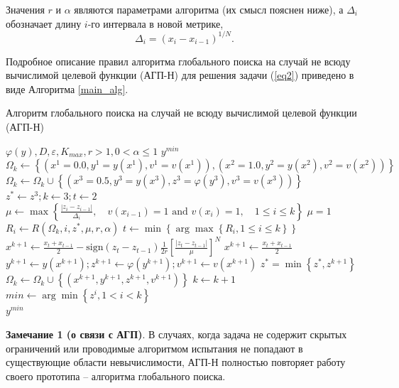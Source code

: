 \documentclass[a4paper,12pt,russian]{article}
\begin{document}
Значения $r$ и $\alpha$ являются параметрами алгоритма (их смысл пояснен ниже), а $\Delta_i$ обозначает длину $i$-го интервала в новой метрике,
\[
\Delta _i= (x_i-x_{i-1})^{1/N}.
\]

Подробное описание правил алгоритма глобального поиска на случай не всюду вычислимой целевой функции (АГП-Н)  для решения задачи (\ref{eq2}) приведено в виде Алгоритма \ref{main_alg}.

\begin{algorithm}
\caption{Алгоритм глобального поиска на случай не всюду вычислимой целевой функции (АГП-Н)}\label{main_alg}
\begin{algorithmic}[1]
\Require $\varphi(y), D, \varepsilon, K_{max}, r >1, 0 < \alpha \leq 1$
\Ensure $y^{min}$
\State $\Omega_k \gets \left\{(x^1 = 0.0, y^1 = y(x^1), v^1=v(x^1)), (x^2 = 1.0, y^2 = y(x^2), v^2 = v(x^2))\right\}$
\State $\Omega_k \gets \Omega_k \cup \left\{(x^3 = 0.5, y^3 = y(x^3), z^3 = \varphi(y^3), v^3 = v(x^3))\right\}$
\State $z^* \gets z^3; k \gets 3; t \gets 2$
    \State $\mu \gets \max\left\{ \frac{|z_i-z_{i-1}|}{\Delta _i},\quad v(x_{i-1}) = 1 \text{ and } v(x_i) = 1, \quad 1 \leq i \leq k  \right\}$
       \State $\mu = 1$
   \EndIf
        \State $R_i \gets R(\Omega_k, i, z^*, \mu, r, \alpha)$
    \EndFor
    \State $t \gets \min \left\{\arg\max \left\{ R_i, 1 \leq i \leq k \right\}\right\}$
        \State $x^{k+1} \gets \frac {x_t+x_{t-1}}{2} -  \text{sign} {(z_t-z_{t-1})} \frac{1}{2r} \left[\frac {{|z_t-z_{t-1}|}}{\mu} \right]^N$
    \Else
        \State $x^{k+1} \gets \frac {x_t+x_{t-1}}{2}$
    \EndIf
    \State $y^{k + 1} \gets y(x^{k + 1}); z^{k + 1} \gets \varphi(y^{k + 1}); v^{k+1} \gets v(x^{k+1})$
    \State $z^* = \min \left \{z^*, z^{k+1}\right \}$
    \State$\Omega_k \gets \Omega_k \cup \left\{(x^{k+1}, y^{k+1}, z^{k+1}, v^{k+1})\right\}$
    \State $k \gets k + 1$
\EndWhile
\State $min \gets \arg \min \left\{ z^i, 1 < i < k \right\}$\\
\Return $y^{min}$
\end{algorithmic}
\end{algorithm}

\textbf{Замечание 1 (о связи с АГП)}. В случаях, когда задача не содержит скрытых ограничений или проводимые алгоритмом испытания не попадают в существующие области невычислимости, АГП-Н полностью повторяет работу своего прототипа -- алгоритма глобального поиска.
\end{document}
